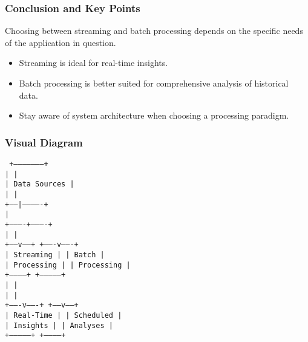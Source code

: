 \documentclass[aspectratio=169]{beamer}
\begin{document}
\begin{frame}[fragile]
    \frametitle{Conclusion and Key Points}
    Choosing between streaming and batch processing depends on the specific needs of the application in question. 
    \begin{itemize}
        \item Streaming is ideal for real-time insights.
        \item Batch processing is better suited for comprehensive analysis of historical data.
        \item Stay aware of system architecture when choosing a processing paradigm.
    \end{itemize}
\end{frame}

\begin{frame}[fragile]
    \frametitle{Visual Diagram}
    \begin{center}
        \texttt{ 
                  +--------------------+ \\
                  |                    | \\
                  |   Data Sources     | \\
                  |                    | \\
                  +------|-------------+ \\
                         | \\
              +----------+----------+ \\
              |                     | \\
        +-----v-----+       +-------v-------+ \\
        | Streaming  |       |   Batch       | \\
        | Processing |       |   Processing   | \\
        +-----------+        +---------------+ \\
              |                       | \\
              |                       | \\
      +-------v-------+         +-----v-----+ \\
      | Real-Time     |         | Scheduled | \\
      | Insights      |         | Analyses  | \\
      +---------------+         +-----------+ \\
        }
    \end{center}
\end{frame}
\end{document}
